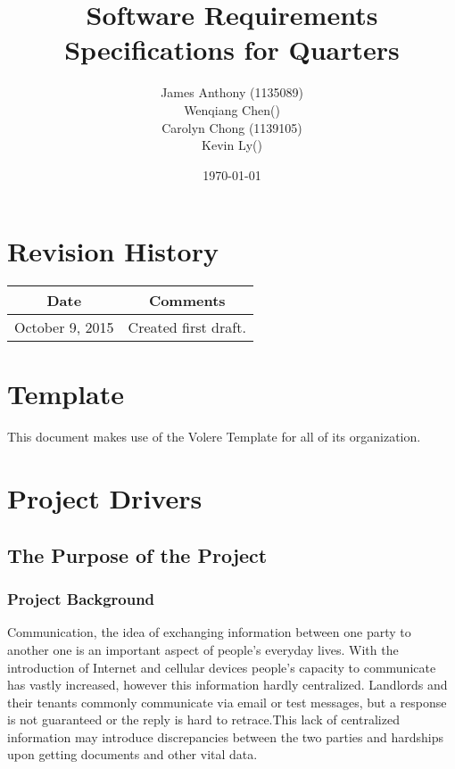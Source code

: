 \documentclass[12pt, titlepage]{article}
\begin{document}
\title{Software Requirements Specifications for Quarters} 
\author{James Anthony (1135089)\\ Wenqiang Chen()\\ Carolyn Chong (1139105)\\ Kevin Ly()}
\date{\today}
\maketitle

\tableofcontents 
\listoffigures
\listoftables

\section*{Revision History}
\begin{tabular}{|c|c|}
\hline
\textbf{Date}  & \textbf{Comments} \\ \hline
October 9, 2015 & Created first draft. \\ 
\hline
\end{tabular}

\section*{Template}
This document makes use of the Volere Template for all of its organization.

\pagebreak

\section{Project Drivers}
\subsection{The Purpose of the Project}
\subsubsection{Project Background}
Communication, the idea of exchanging information between one party to another 
one is an important aspect of people's everyday lives. With the introduction 
of Internet and cellular devices people's capacity to communicate has vastly 
increased, however this information hardly centralized. Landlords and their 
tenants commonly communicate via email or test messages, but a response is not 
guaranteed or the reply is hard to retrace.This lack of centralized 
information may introduce discrepancies between the two parties and hardships 
upon getting documents and other vital data.
\end{document}
